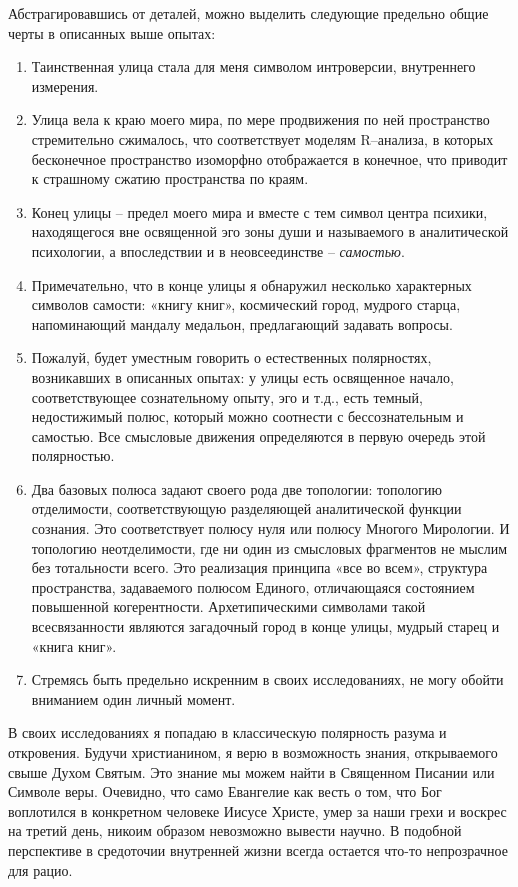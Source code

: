 Абстрагировавшись от деталей, можно выделить следующие предельно общие черты в описанных выше опытах:
\begin{enumerate}
	\item Таинственная улица стала для меня символом интроверсии, внутреннего измерения.
	\item Улица вела к краю моего мира, по мере продвижения по ней пространство стремительно сжималось, что соответствует моделям R–анализа, в которых бесконечное пространство изоморфно отображается в конечное, что приводит к страшному сжатию пространства по краям.
	\item Конец улицы – предел моего мира и вместе с тем символ центра психики, находящегося вне освященной эго зоны души и называемого в аналитической психологии, а впоследствии и в неовсеединстве – \textit{самостью}.
	\item Примечательно, что в конце улицы я обнаружил несколько характерных символов самости: «книгу книг», космический город, мудрого старца, напоминающий мандалу медальон, предлагающий задавать вопросы.
	\item Пожалуй, будет уместным говорить о естественных полярностях, возникавших в описанных опытах: у улицы есть освященное начало, соответствующее сознательному опыту, эго и т.д., есть темный, недостижимый полюс, который можно соотнести с бессознательным и самостью. Все смысловые движения определяются в первую очередь этой полярностью.
	\item Два базовых полюса задают своего рода две топологии: топологию отделимости, соответствующую разделяющей аналитической функции сознания. Это соответствует полюсу нуля или полюсу Многого Мирологии. И топологию неотделимости, где ни один из смысловых фрагментов не мыслим без тотальности всего. Это реализация принципа «все во всем», структура пространства, задаваемого полюсом Единого, отличающаяся состоянием повышенной когерентности. Архетипическими символами такой всесвязанности являются загадочный город в конце улицы, мудрый старец и «книга книг».
	\item Стремясь быть предельно искренним в своих исследованиях, не могу обойти вниманием один личный момент.
\end{enumerate}

В своих исследованиях я попадаю в классическую полярность разума и откровения. Будучи христианином, я верю в возможность знания, открываемого свыше Духом Святым. Это знание мы можем найти в Священном Писании или Символе веры. Очевидно, что само Евангелие как весть о том, что Бог воплотился в конкретном человеке Иисусе Христе, умер за наши грехи и воскрес на третий день, никоим образом невозможно вывести научно. В подобной перспективе в средоточии внутренней жизни всегда остается что-то непрозрачное для рацио.

